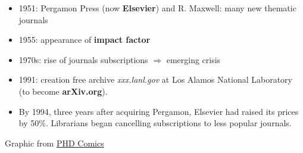 \documentclass[10pt,compress,serif,aspectratio=169]{beamer}
\begin{document}
 \begin{frame}[t]%
 \vskip1cm%
\begin{itemize}

 \item 1951: Pergamon Press (now \textbf{Elsevier}) and R. Maxwell: many new thematic journals
 \item 1955: appearance of \textbf{impact factor}
 \item 1970s: rise of journals subscriptions $\Rightarrow$ emerging crisis
 \item 1991: creation free archive \textit{xxx.lanl.gov} at Los Alamos National Laboratory (to become \textbf{arXiv.org}).
\item By 1994, three years after acquiring Pergamon, Elsevier had raised its prices by 50\%. Librarians began cancelling subscriptions to less popular journals.
\end{itemize}

  \begin{center}
    \small
    Graphic from \href{http://www.phdcomics.com/comics.php?f=1533}{PHD Comics}
  \end{center}
\end{frame}
\end{document}
